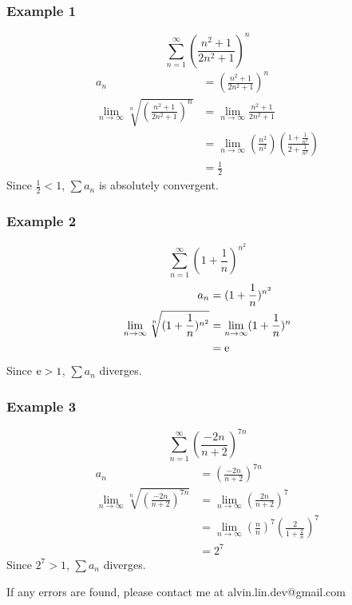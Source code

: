 \documentclass[letterpaper, 12pt]{math}
\begin{document}
\subsubsection*{Example 1}
\[ \sum_{n=1}^{\infty}(\frac{n^{2}+1}{2n^{2}+1})^{n} \]
\begin{align*}
  a_{n} &= (\frac{n^{2}+1}{2n^{2}+1})^{n} \\
  \lim_{n\to\infty}\sqrt[n]{(\frac{n^{2}+1}{2n^{2}+1})^{n}} &=
    \lim_{n\to\infty}\frac{n^{2}+1}{2n^{2}+1} \\
  &= \lim_{n\to\infty}
    (\frac{n^{2}}{n^{2}})(\frac{1+\frac{1}{n^{2}}}{2+\frac{1}{n^{2}}}) \\
  &= \frac{1}{2}
\end{align*}
Since \( \frac{1}{2} < 1 \), \( \sum{a_{n}} \) is absolutely convergent.

\subsubsection*{Example 2}
\[ \sum_{n=1}^{\infty}(1+\frac{1}{n})^{n^{2}} \]
\begin{align*}
  a_{n} &= (1+\frac{1}{n})^{n^{2}} \\
  \lim_{n\to\infty}\sqrt[n]{(1+\frac{1}{n})^{n^{2}}} &=
    \lim_{n\to\infty}(1+\frac{1}{n})^{n} \\
  &= \mathrm{e}
\end{align*}
Since \( \mathrm{e} > 1 \), \( \sum{a_{n}} \) diverges.

\subsubsection*{Example 3}
\[ \sum_{n=1}^{\infty}(\frac{-2n}{n+2})^{7n} \]
\begin{align*}
  a_{n} &= (\frac{-2n}{n+2})^{7n} \\
  \lim_{n\to\infty}\sqrt[n]{(\frac{-2n}{n+2})^{7n}} &=
    \lim_{n\to\infty}(\frac{2n}{n+2})^{7} \\
  &= \lim_{n\to\infty}(\frac{n}{n})^{7}(\frac{2}{1+\frac{2}{n}})^{7} \\
  &= 2^{7}
\end{align*}
Since \( 2^{7} > 1 \), \( \sum{a_{n}} \) diverges.

\begin{center}
  If any errors are found, please contact me at alvin.lin.dev@gmail.com
\end{center}
\end{document}
